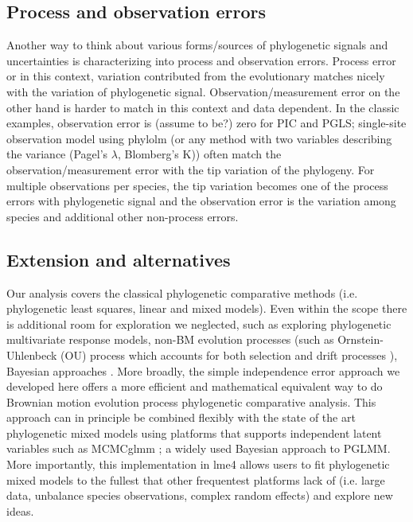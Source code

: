\subsection{Process and observation errors}

Another way to think about various forms/sources of phylogenetic signals and uncertainties is characterizing into process and observation errors.
Process error or in this context, variation contributed from the evolutionary matches nicely with the variation of phylogenetic signal. 
Observation/measurement error on the other hand is harder to match in this context and data dependent.
In the classic examples, observation error is (assume to be?) zero for PIC and PGLS; single-site observation model using phylolm (or any method with two variables describing the variance (Pagel's $\lambda$, Blomberg's K)) often match the observation/measurement error with the tip variation of the phylogeny.
For multiple observations per species, the tip variation becomes one of the process errors with phylogenetic signal and the observation error is the variation among species and additional other non-process errors.

\subsection{Extension and alternatives}

Our analysis covers the classical phylogenetic comparative methods (i.e. phylogenetic least squares, linear and mixed models).
Even within the scope there is additional room for exploration we neglected, such as exploring phylogenetic multivariate response models, non-BM evolution processes (such as Ornstein-Uhlenbeck (OU) process which accounts for both selection and drift processes \cite{butler2004phylogenetic}), Bayesian approaches \cite{hadfield2010general}.
More broadly, the simple independence error approach we developed here offers a more efficient and mathematical equivalent way to do Brownian motion evolution process phylogenetic comparative analysis. 
This approach can in principle be combined flexibly with the state of the art phylogenetic mixed models using platforms that supports independent latent variables such as MCMCglmm \cite{hadfield2010mcmc}; a widely used Bayesian approach to PGLMM. 
More importantly, this implementation in lme4 allows users to fit phylogenetic mixed models to the fullest that other frequentest platforms lack of (i.e. large data, unbalance species observations, complex random effects) and explore new ideas.

